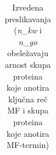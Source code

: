 \begin{table}[htpb]
\begin{tabular}{|p{4.7cm}|c|c|c|p{5cm}|}

\end{tabular}
  \caption{Izvedena preslikavanja \small 
  (\textit{n\_kw} i \textit{n\_go} obeležavaju arnost skupa proteina koje anotira ključna reč MF i skupa proteina koje anotira MF-termin) }
  \label{tab:izvedeno_mapiranje}
\end{table}


